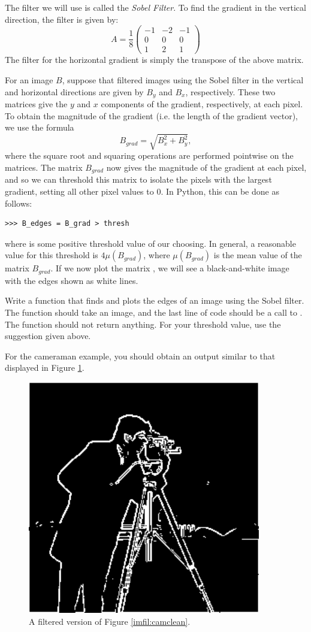 The filter we will use is called the \emph{Sobel Filter}. To find the gradient 
in the vertical direction, the filter is given by:
\[
A = \frac{1}{8}\begin{pmatrix}
-1&-2&-1\\
0&0&0\\
1&2&1
\end{pmatrix}
\]
The filter for the horizontal gradient is simply the transpose of the above matrix.

For an image $B$, suppose that filtered images using the Sobel filter in the vertical and
horizontal directions are given by $B_y$ and $B_x$, respectively. These two matrices give
the $y$ and $x$ components of the gradient, respectively, at each pixel. To obtain the 
magnitude of the gradient (i.e. the length of the gradient vector), we use the formula
$$
B_{grad} = \sqrt{B_x^2 + B_y^2},
$$
where the square root and squaring operations are performed pointwise on the matrices. 
The matrix $B_{grad}$ now gives the magnitude of the gradient at each pixel, and so we
can threshold this matrix to isolate the pixels with the largest gradient, setting all 
other pixel values to 0. 
In Python, this can be done as follows:
\begin{lstlisting}
>>> B_edges = B_grad > thresh
\end{lstlisting}
where  is some positive threshold value of our choosing. In general, a reasonable
value for this threshold is $4\mu(B_{grad})$, where $\mu(B_{grad})$ is the mean value of the 
matrix $B_{grad}$.
If we now plot the matrix , we will see a black-and-white image with the edges 
shown as white lines.

\begin{problem}
Write a function  that finds and plots the edges of an image using the Sobel filter.
The function should take an image, and the last line of code should be a call 
to . The function should not return anything. For your threshold value, use the 
suggestion given above.

For the cameraman example, you should obtain an output similar to that displayed in 
Figure \ref{imfil:edges}.
\end{problem}

\begin{figure}[h!]
\includegraphics{edges.pdf}
\caption{A filtered version of Figure \ref{imfil:camclean}.}
\label{imfil:edges}
\end{figure}
